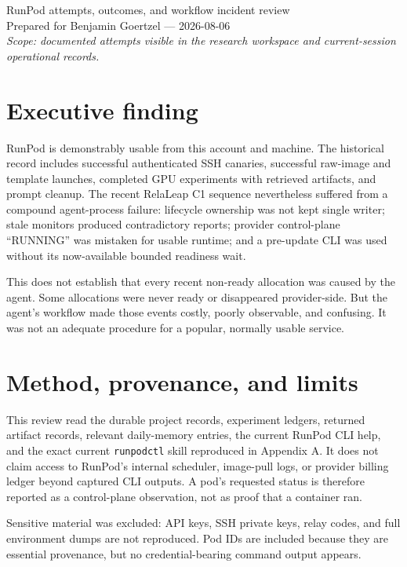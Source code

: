 \documentclass[10pt]{article}
\begin{document}
\begin{center}
{\LARGE RunPod attempts, outcomes, and workflow incident review}\\[0.4em]
{\large Prepared for Benjamin Goertzel --- 2026-08-06}\\[0.6em]
\textit{Scope: documented attempts visible in the research workspace and current-session operational records.}
\end{center}

\section*{Executive finding}

RunPod is demonstrably usable from this account and machine.  The historical
record includes successful authenticated SSH canaries, successful raw-image
and template launches, completed GPU experiments with retrieved artifacts,
and prompt cleanup.  The recent RelaLeap C1 sequence nevertheless suffered
from a compound agent-process failure: lifecycle ownership was not kept single
writer; stale monitors produced contradictory reports; provider control-plane
``RUNNING'' was mistaken for usable runtime; and a pre-update CLI was used
without its now-available bounded readiness wait.

This does not establish that every recent non-ready allocation was caused by
the agent.  Some allocations were never ready or disappeared provider-side.
But the agent's workflow made those events costly, poorly observable, and
confusing.  It was not an adequate procedure for a popular, normally usable
service.

\section*{Method, provenance, and limits}

This review read the durable project records, experiment ledgers, returned
artifact records, relevant daily-memory entries, the current RunPod CLI help,
and the exact current \texttt{runpodctl} skill reproduced in Appendix A. It
does not claim access to RunPod's internal scheduler, image-pull logs, or
provider billing ledger beyond captured CLI outputs.  A pod's requested status
is therefore reported as a control-plane observation, not as proof that a
container ran.

Sensitive material was excluded: API keys, SSH private keys, relay codes, and
full environment dumps are not reproduced.  Pod IDs are included because they
are essential provenance, but no credential-bearing command output appears.
\end{document}
